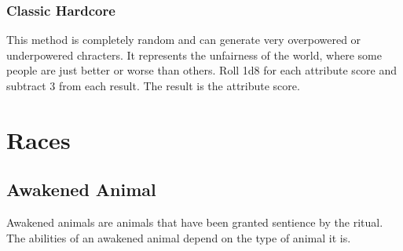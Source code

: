 \begin{comment}
\subsubsection{Weighted Semi-Randomized Point Buy}
This method gives you more control over your attribute scores, while still requiring you to deal with attribute score advantages or disadvantages that you might not have chosen. It functions like the semi-randomized point buy method, except that you do not roll 3d6 for every attribute score. You have a pool of 18 dice. You can distribute those dice as you choose between each attribute score, except the last one, which is automatically assigned your remaining points. If you roll more than three dice for an attribute score, keep only the highest 3 dice. If you assign fewer than three dice to roll for an attribute score, add 1 to the result for every die less than 3 you are rolling. You can roll as many as six dice for a single attribute score, and you cannot roll less than one die for an attribute score.

For example, player hoping to play a barbarian might assign six dice to Strength, five dice to Constitution, three dice to Dexterity, and two dice to each of Intelligence and Wisdom, leaving the rest of the points to Charisma.
\end{comment}

\subsubsection{Classic Hardcore}

This method is completely random and can generate very overpowered or underpowered chracters. It represents the unfairness of the world, where some people are just better or worse than others. Roll 1d8 for each attribute score and subtract 3 from each result. The result is the attribute score.

\newpage

\section{Races}

\subsection{Awakened Animal}

Awakened animals are animals that have been granted sentience by the  ritual.
The abilities of an awakened animal depend on the type of animal it is.

